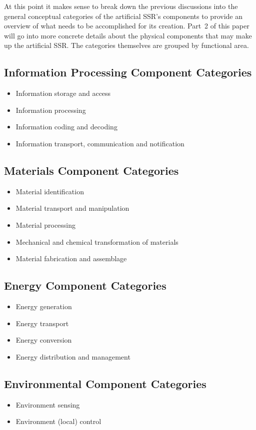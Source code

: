 At this point it makes sense to break down the previous discussions
into the general conceptual categories of the artificial SSR's components
to provide an overview of what needs to be accomplished for its creation.
Part~2 of this paper will go into more concrete details about the
physical components that may make up the artificial SSR.  The categories
themselves are grouped by functional area.

\subsection{Information Processing Component Categories}
\begin{itemize}
\item Information storage and access
\item Information processing
\item Information coding and decoding
\item Information transport, communication and notification
\end{itemize}

\subsection{Materials Component Categories}
\begin{itemize}
\item Material identification
\item Material transport and manipulation
\item Material processing
\item Mechanical and chemical transformation of materials
\item Material fabrication and assemblage
\end{itemize}

\subsection{Energy Component Categories}
\begin{itemize}
\item Energy generation
\item Energy transport
\item Energy conversion
\item Energy distribution and management
\end{itemize}

\subsection{Environmental Component Categories}
\begin{itemize}
\item Environment sensing
\item Environment (local) control
\end{itemize}

